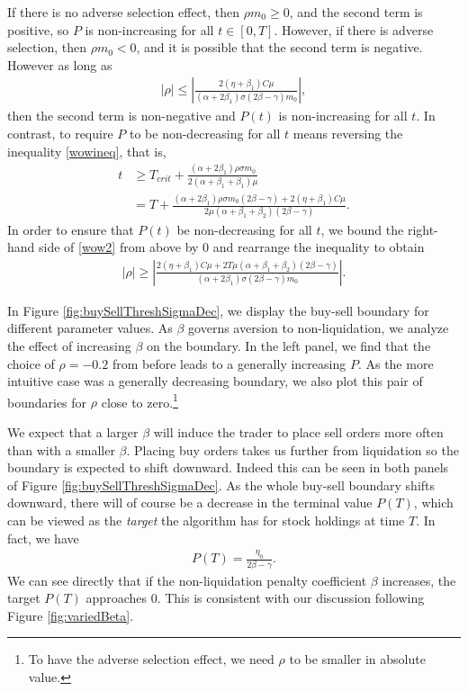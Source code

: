 \documentclass[12pt, letterpaper]{article}
\numberwithin{equation}{section}
\numberwithin{theorem}{section}
\begin{document}
If there is no adverse selection effect, then $\rho m_0\ge0$, and the second term is positive, so $P$ is non-increasing for all $t\in[0,T]$. However, if there is adverse selection, then $\rho m_0<0$, and it is possible that the second term is negative. However as long as
\begin{equation*}
\begin{aligned} 
|\rho| \le\left|\frac{2(\eta+\beta_1)C\mu}{(\alpha+2\beta_1)\sigma(2\beta-\gamma)m_0}\right|,
\end{aligned}
\end{equation*}
then the second term is non-negative and $P(t)$ is non-increasing for all $t$.
In contrast, to require $P$ to be non-decreasing for all $t$ means reversing the inequality \eqref{wowineq}, that is,
\begin{align}
t&\ge T_{crit}+\frac{(\alpha+2\beta_1)\rho\sigma m_0}{2(\alpha+\beta_1+\beta_1)\mu}\\
&=T+\frac{(\alpha+2\beta_1)\rho\sigma m_0(2\beta-\gamma)+2(\eta+\beta_1)C\mu}{2\mu(\alpha+\beta_1+\beta_2)(2\beta-\gamma)}.\label{wow2}
\end{align}
In order to ensure  that $P(t)$ be  non-decreasing for all $t$, we bound the right-hand side of \eqref{wow2} from above by 0 and rearrange the inequality to obtain
\begin{equation*}
\begin{aligned} 
|\rho| \ge\left|\frac{2(\eta+\beta_1)C\mu+ 2T\mu(\alpha+\beta_1+\beta_2)(2\beta-\gamma)}{(\alpha+2\beta_1)\sigma(2\beta-\gamma)m_0}\right|.
\end{aligned}
\end{equation*}

In Figure \ref{fig:buySellThreshSigmaDec}, we display the buy-sell boundary for different parameter values. As $\beta$ governs aversion to non-liquidation, we analyze the effect of increasing $\beta$ on the boundary. In the left panel, we find that the choice of $\rho=-0.2$ from before leads to a generally increasing $P$. As the more intuitive case was a generally decreasing boundary, we also plot this pair of boundaries for $\rho$ close to zero.\footnote{To have the adverse selection effect, we need $\rho$ to be smaller in absolute value.}

We expect that a larger $\beta$ will induce the trader to place sell orders more often than with a smaller $\beta$. Placing buy   orders takes us further from liquidation so the boundary is expected to shift downward. Indeed this can be seen in both panels of Figure \ref{fig:buySellThreshSigmaDec}. As the whole buy-sell boundary shifts downward, there will of course be a decrease in the terminal value $P(T)$, which can be viewed as the \textit{target} the algorithm has for stock holdings at time $T$. In fact, we have
\begin{equation}
\begin{aligned}
P(T)=\frac{\eta_0}{2\beta-\gamma}.
\end{aligned}
\end{equation}
We can see directly that if the non-liquidation penalty coefficient $\beta$ increases, the target $P(T)$ approaches $0$. This is consistent with  our discussion following Figure \ref{fig:variedBeta}.
\end{document}
